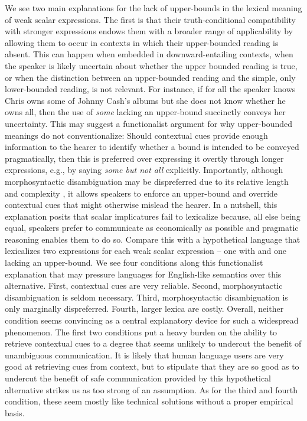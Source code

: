 \documentclass[a4paper, 11pt]{article}
\begin{document}
We see two main explanations for the lack of upper-bounds in the lexical meaning of weak scalar expressions. The first is that their truth-conditional compatibility with stronger expressions endows them with a broader range of applicability by allowing them to occur in contexts in which their upper-bounded reading is absent. This can happen when embedded in downward-entailing contexts, when the speaker is likely uncertain about whether the upper bounded reading is true, or when the distinction between an upper-bounded reading and the simple, only lower-bounded reading, is not relevant. For instance, if for all the speaker knows Chris owns some of Johnny Cash's albums but she does not know whether he owns all, then the use of {\em some} lacking an upper-bound succinctly conveys her uncertainty. This may suggest a functionalist argument for why upper-bounded meanings do not conventionalize: Should contextual cues provide enough information to the hearer to identify whether a bound is intended to be conveyed pragmatically, then this is preferred over expressing it overtly through longer expressions, e.g., by saying {\em some but not all} explicitly. Importantly, although morphosyntactic disambiguation may be dispreferred due to its relative length and complexity \citep{piantadosi+etal:2012b}, it allows speakers to enforce an upper-bound and override contextual cues that might otherwise mislead the hearer. In a nutshell, this explanation posits that scalar implicatures fail to lexicalize because, all else being equal, speakers prefer to communicate as economically as possible and pragmatic reasoning enables them to do so. Compare this with a hypothetical language that lexicalizes two expressions for each weak scalar expression -- one with and one lacking an upper-bound. We see four conditions along this functionalist explanation that may pressure languages for English-like semantics over this alternative. First, contextual cues are very reliable. Second, morphosyntactic disambiguation is seldom necessary. Third, morphosyntactic disambiguation is only marginally dispreferred. Fourth, larger lexica are costly. Overall, neither condition seems convincing as a central explanatory device for such a widespread phenomenon. The first two conditions put a heavy burden on the ability to retrieve contextual cues to a degree that seems unlikely to undercut the benefit of unambiguous communication. It is likely that human language users are very good at retrieving cues from context, but to stipulate that they are so good as to undercut the benefit of safe communication provided by this hypothetical alternative strikes us as too strong of an assumption.  As for the third and fourth condition, these seem mostly like technical solutions without a proper empirical basis. 
\end{document}
